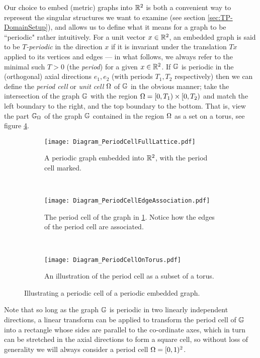 Our choice to embed (metric) graphs into $\reals^2$ is both a convenient way to represent the singular structures we want to examine (see section \ref{sec:TP-DomainSetup}), and allows us to define what it means for a graph to be ``periodic" rather intuitively.
For a unit vector $x\in\mathbb{R}^2$, an embedded graph is said to be \emph{$T$-periodic} in the direction $x$ if it is invariant under the translation $Tx$ applied to its vertices and edges --- in what follows, we always refer to the minimal such $T>0$ (the \emph{period}) for a given $x\in\mathbb{R}^2$.
If $\mathbb{G}$ is periodic in the (orthogonal) axial directions $e_1, e_2$ (with periods $T_1, T_2$ respectively) then we can define the \emph{period cell} or \emph{unit cell} $\Omega$ of $\mathbb{G}$ in the obvious manner; take the intersection of the graph $\mathbb{G}$ with the region $\Omega = [0,T_1)\times [0,T_2)$ and match the left boundary to the right, and the top boundary to the bottom.
That is, view the part $\mathbb{G}_{\Omega}$ of the graph $\mathbb{G}$ contained in the region $\Omega$ as a set on a torus, see figure \ref{fig:PeriodCellIllustration}.
\begin{figure}[t!]
	\centering
	\begin{subfigure}[t]{0.45\textwidth}
		\centering
		\texttt{[image: Diagram\_PeriodCellFullLattice.pdf]}
		\caption[]{\label{fig:Diagram_PeriodCellFullLattice} A periodic graph embedded into $\reals^2$, with the period cell marked.}
	\end{subfigure}
	~
	\begin{subfigure}[t]{0.45\textwidth}
		\centering
		\texttt{[image: Diagram\_PeriodCellEdgeAssociation.pdf]}
		\caption[]{\label{fig:Diagram_PeriodCellEdgeAssociation} The period cell of the graph in \ref{fig:Diagram_PeriodCellFullLattice}. Notice how the edges of the period cell are associated.}
	\end{subfigure}
	\\
	\begin{subfigure}[b]{0.75\textwidth}
		\centering
		\texttt{[image: Diagram\_PeriodCellOnTorus.pdf]}
		\caption[]{\label{fig:Diagram_PeriodCellOnTorus} An illustration of the period cell as a subset of a torus.}
	\end{subfigure}
	\caption[The period cell of a periodic graph embedded in $\reals^2$; viewed as a subregion of $\reals^2$, and on the torus.]{\label{fig:PeriodCellIllustration} Illustrating a periodic cell of a periodic embedded graph.}
\end{figure} 
Note that so long as the graph $\mathbb{G}$ is periodic in two linearly independent directions, a linear transform can be applied to transform the period cell of $\mathbb{G}$ into a rectangle whose sides are parallel to the co-ordinate axes, which in turn can be stretched in the axial directions to form a square cell, so without loss of generality we will always consider a period cell $\Omega=[0,1)^2$.
